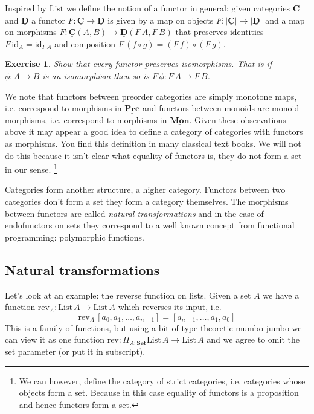 \documentclass{article}
\newcommand{\Set}{\mathbf{Set}}
\newcommand{\cat}[1]{\underline{\mathbf{#1}}}
\newcommand{\obj}[1]{|#1|}
\newcommand{\id}{\mathrm{id}}
\newcommand{\List}{\mathrm{List}}
\newcommand{\rev}{\mathrm{rev}}
\newtheorem{exercise}{Exercise}
\begin{document}
Inspired by $\List$ we define the notion of a functor in general: given categories $\cat{C}$ and $\cat{D}$ a functor $F : \cat{C} \to \cat{D}$ is given by a map on objects $F : \obj{\cat{C}} \to \obj{\cat{D}}$ and a map on morphisms 
$F : \cat{C}(A,B) \to \cat{D}(F\,A,F\,B)$ that preserves identities $F\,\id_A = \id_{F\,A}$ and composition $F\,(f \circ g) = (F\,f) \circ (F\,g)$.

\begin{exercise}
  Show that every functor preserves isomorphisms. That is if $\phi : A \to B$ is an isomorphism then so is $F\,\phi : F\,A \to F\,B$.
\end{exercise}

We note that functors between preorder categories are simply monotone maps, i.e. correspond to morphisms in $\cat{Pre}$ and functors between monoids are monoid morphisms, i.e. correspond to morphisms in $\cat{Mon}$. Given these observations above it may appear a good idea to define a category of categories with functors as morphisms. You find this definition in many classical text books. We will not do this because it isn't clear what equality of functors is, they do not form a set in our sense.
\footnote{We can however, define the category of strict categories, i.e. categories whose objects form a set. Because in this case equality of functors is a proposition and hence functors form a set.}

Categories form another structure, a higher category. Functors between two categories don't form a set they form a category themselves.
The morphisms between functors are called \emph{natural transformations} and in the case of endofunctors on sets they correspond to a well known concept from functional programming: polymorphic functions. 

\subsection{Natural transformations}
\label{sec:natfns}

Let's look at an example: the reverse function on lists. Given a set $A$ we have a function $\rev_A : \List\,A \to \List\,A$ which reverses its input, i.e. 
\[\rev_A\, [a_0,a_1,\dots,a_{n-1}] = [a_{n-1},\dots,a_1,a_0]\]
This is a family of functions, but using a bit of type-theoretic mumbo jumbo we can view it as one function $\rev : \Pi_{A:\Set} \List\,A \to \List\,A$ and we agree to omit the set parameter (or put it in subscript). 
\end{document}
